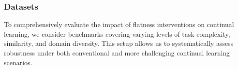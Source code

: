 \documentclass[letterpaper]{article} %
\begin{document}






\subsubsection{Datasets}
To comprehensively evaluate the impact of flatness interventions on continual learning, we consider benchmarks covering varying levels of task complexity, similarity, and domain diversity. This setup allows us to systematically assess robustness under both conventional and more challenging continual learning scenarios.
\end{document}
